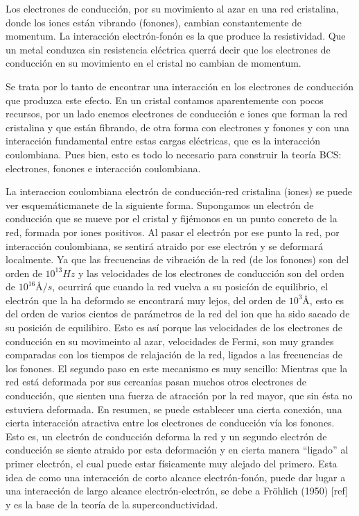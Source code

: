 Los electrones de conducción, por su movimiento al azar en una red cristalina, donde los iones están vibrando (fonones), cambian constantemente de momentum. La interacción electrón-fonón es la que produce la resistividad. Que un metal conduzca sin resistencia eléctrica querrá decir que los electrones de conducción en su movimiento en el cristal no cambian de momentum.

Se trata por lo tanto de encontrar una interacción en los electrones de conducción que produzca este efecto. En un cristal contamos aparentemente con pocos recursos, por un lado enemos electrones de conducción e iones que forman la red cristalina y que están fibrando, de otra forma con electrones y fonones y con una interacción fundamental entre estas cargas eléctricas, que es la interacción coulombiana. Pues bien, esto es todo lo necesario para construir la teoría BCS: electrones, fonones e interacción coulombiana.

La interaccion coulombiana electrón de conducción-red cristalina (iones) se puede ver esquemáticmanete de la siguiente forma. Supongamos un electrón de conducción que se mueve por el cristal y fijémonos en un punto concreto de la red, formada por iones positivos. Al pasar el electrón por ese punto la red, por interacción coulombiana, se sentirá atraido por ese electrón y se deformará localmente. Ya que las frecuencias de vibración de la red (de los fonones) son del orden de $10^{13} Hz$ y las velocidades de los electrones de conducción son del orden de $10^{16} Å/s$, ocurrirá que cuando la red vuelva a su posicíón de equilibrio, el electrón que la ha deformdo se encontrará muy lejos, del orden de $10^3 Å$, esto es del orden de varios cientos de parámetros de la red del ion que ha sido sacado de su posición de equilibiro. Esto es así porque las velocidades de los electrones de conducción en su movimeinto al azar, velocidades de Fermi, son muy grandes comparadas con los tiempos de relajación de la red, ligados a las frecuencias de los fonones. El segundo paso en este mecanismo es muy sencillo: Mientras que la red está deformada por sus cercanías pasan muchos otros electrones de conducción, que sienten una fuerza de atracción por la red mayor, que sin ésta no estuviera deformada. En resumen, se puede establecer una cierta conexión, una cierta interacción atractiva entre los electrones de conducción vía los fonones. Esto es, un electrón de conducción deforma la red y un segundo electrón de conducción se siente atraido por esta deformación y en cierta manera ``ligado'' al primer electrón, el cual puede estar físicamente muy alejado del primero. Esta idea de como una interacción de corto alcance electrón-fonón, puede dar lugar a una interacción de largo alcance electrón-electrón, se debe a Fröhlich (1950) [ref] y es la base de la teoría de la superconductividad.

